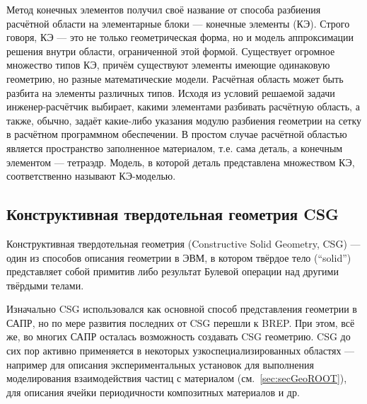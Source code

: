 Метод конечных элементов получил своё название от способа разбиения расчётной области на элементарные блоки --- конечные элементы (КЭ). Строго говоря, КЭ --- это не только геометрическая форма, но и модель аппроксимации решения внутри области, ограниченной этой формой. Существует огромное множество типов КЭ, причём существуют элементы имеющие одинаковую геометрию, но разные математические модели. Расчётная область может быть разбита на элементы различных типов. Исходя из условий решаемой задачи инженер-расчётчик выбирает, какими элементами разбивать расчётную область, а также, обычно, задаёт какие-либо указания модулю разбиения геометрии на сетку в расчётном программном обеспечении. В простом случае расчётной областью является пространство заполненное материалом, т.е. сама деталь, а конечным элементом --- тетраэдр. Модель, в которой деталь представлена множеством КЭ, соответственно называют КЭ-моделью.



\subsection{Конструктивная твердотельная геометрия CSG}\label{sec:secGeoCSG}

Конструктивная твердотельная геометрия (Constructive Solid Geometry, CSG) --- один из способов описания геометрии в ЭВМ, в котором твёрдое тело (``solid'') представляет собой примитив либо результат Булевой операции над другими твёрдыми телами.

Изначально CSG использовался как основной способ представления геометрии в САПР, но по мере развития последних от CSG перешли к BREP. При этом, всё же, во многих САПР осталась возможность создавать CSG геометрию. CSG до сих пор активно применяется в некоторых узкоспециализированных областях --- например для описания экспериментальных установок для выполнения моделирования взаимодействия частиц с материалом (см.~\ref{sec:secGeoROOT}), для описания ячейки периодичности композитных материалов и др.

